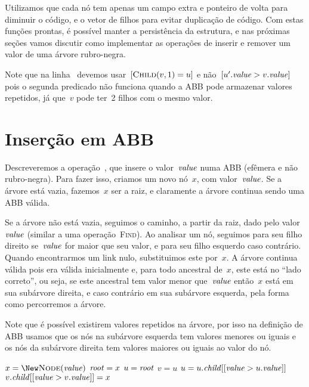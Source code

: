 \documentclass[../../main.tex]{subfiles}
\begin{document}
Utilizamos que cada nó tem apenas um campo extra e ponteiro de volta para diminuir o código, e o vetor de filhos para evitar duplicação de código. Com estas funções prontas, é possível manter a persistência da estrutura, e nas próximas seções vamos discutir como implementar as operações de inserir e remover um valor de uma árvore rubro-negra.

Note que na linha~ devemos usar~$[\Call{Child}{v, 1} = u]$ e não~$[u'.\mathit{value} > v.\mathit{value}]$ pois o segunda predicado não funciona quando a ABB pode armazenar valores repetidos, já que~$v$ pode ter~2 filhos com o mesmo valor.

\section{Inserção em ABB}

Descreveremos a operação~, que insere o valor~$\mathit{value}$ numa ABB (efêmera e não rubro-negra). Para fazer isso, criamos um novo nó~$x$, com valor~$\mathit{value}$. Se a árvore está vazia, fazemos~$x$ ser a raiz, e claramente a árvore continua sendo uma ABB válida.

Se a árvore não está vazia, seguimos o caminho, a partir da raiz, dado pelo valor~$\mathit{value}$ (similar a uma operação~\textsc{Find}). Ao analisar um nó, seguimos para seu filho direito se~$\mathit{value}$ for maior que seu valor, e para seu filho esquerdo caso contrário. Quando encontrarmos um link nulo, substituimos este por~$x$. A árvore continua válida pois era válida inicialmente e, para todo ancestral de~$x$, este está no ``lado correto'', ou seja, se este ancestral tem valor menor que~$\mathit{value}$ então~$x$ está em sua subárvore direita, e caso contrário em sua subárvore esquerda, pela forma como percorremos a árvore.

Note que é possível existirem valores repetidos na árvore, por isso na definição de ABB usamos que os nós na subárvore esquerda tem valores menores ou iguais e os nós da subárvore direita tem valores maiores ou iguais ao valor do nó.

\begin{algorithm}
\begin{algorithmic}[1]

	\State $x = \New \Call{Node}{\val}$ 
		\State $\mathit{root} = x$
	\Else
		\State $u = \mathit{root}$
		 
			\State $v = u$
			\State $u = u.\mathit{child}[[\mathit{value} > u.\mathit{value}]]$
		\EndWhile
		\State $v.\mathit{child}[[\mathit{value} > v.\mathit{value}]] = x$
	\EndIf
\EndFunction

\end{algorithmic}
\end{algorithm}
\end{document}
